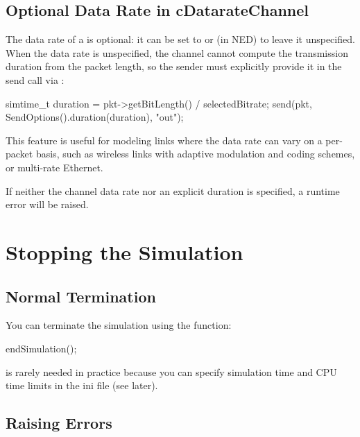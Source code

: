 \subsection{Optional Data Rate in cDatarateChannel}
\label{sec:simple-modules:optional-datarate}

The data rate of a  is optional: it can be set to
 or  (in NED) to leave it unspecified. When the data rate is
unspecified, the channel cannot compute the transmission duration from the
packet length, so the sender must explicitly provide it in the send call
via :

\begin{cpp}
simtime_t duration = pkt->getBitLength() / selectedBitrate;
send(pkt, SendOptions().duration(duration), "out");
\end{cpp}

This feature is useful for modeling links where the data rate can vary on a
per-packet basis, such as wireless links with adaptive modulation and coding
schemes, or multi-rate Ethernet.

If neither the channel data rate nor an explicit duration is specified, a
runtime error will be raised.


\section{Stopping the Simulation}
\label{sec:simple-modules:stopping}

\subsection{Normal Termination}
\label{sec:simple-modules:endsimulation}

You can terminate the simulation using the  function:

\begin{cpp}
endSimulation();
\end{cpp}

 is rarely needed in practice because you
can specify simulation time and CPU time limits
in the ini file (see later).

\subsection{Raising Errors}
\label{sec:simple-modules:raising-errors}

